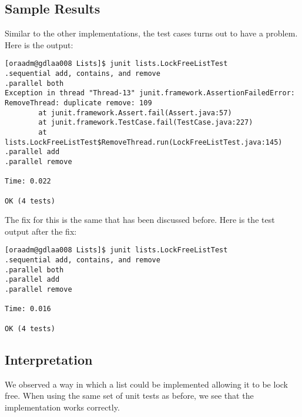 \subsection{Sample Results}
\par
Similar to the other implementations, the test cases turns out to have a
problem. Here is the output:
\par
\begin{verbatim}
[oraadm@gdlaa008 Lists]$ junit lists.LockFreeListTest
.sequential add, contains, and remove
.parallel both
Exception in thread "Thread-13" junit.framework.AssertionFailedError:
RemoveThread: duplicate remove: 109
        at junit.framework.Assert.fail(Assert.java:57)
        at junit.framework.TestCase.fail(TestCase.java:227)
        at lists.LockFreeListTest$RemoveThread.run(LockFreeListTest.java:145)
.parallel add
.parallel remove

Time: 0.022

OK (4 tests)
\end{verbatim}
\par
The fix for this is the same that has been discussed before. Here is the test
output after the fix:
\begin{verbatim}
[oraadm@gdlaa008 Lists]$ junit lists.LockFreeListTest
.sequential add, contains, and remove
.parallel both
.parallel add
.parallel remove

Time: 0.016

OK (4 tests)
\end{verbatim}
\par
\subsection{Interpretation}
We observed a way in which a list could be implemented allowing it to be lock
free. When using the same set of unit tests as before, we see that the
implementation works correctly.
